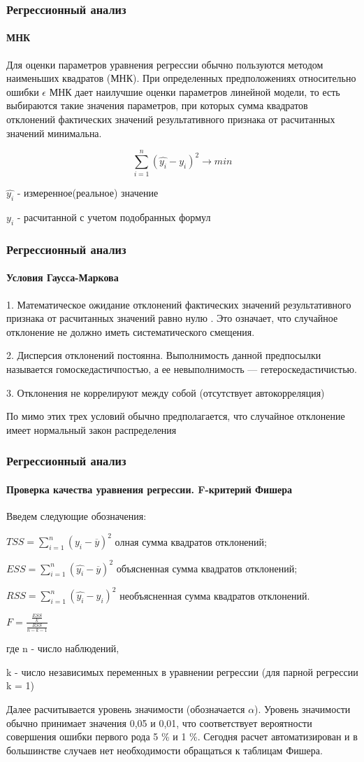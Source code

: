 \documentclass[10pt,pdf,hyperref={unicode}]{beamer}
\begin{document}
\begin{frame}
\frametitle{Регрессионный анализ} 
\framesubtitle{МНК}

Для оценки параметров  уравнения регрессии обычно пользуются
методом наименьших квадратов (МНК). При определенных предположениях
относительно ошибки $\epsilon$ МНК дает наилучшие оценки параметров линейной
модели, то  есть выбираются такие значения параметров, при которых
сумма квадратов отклонений фактических значений результативного признака
от расчитанных значений минимальна.

$$ \sum_{i=1}^n(\hat{y_i} -y_i)^2 \rightarrow min$$ 

$\hat{y_i}$ - измеренное(реальное) значение

$y_i$   -  расчитанной с учетом подобранных формул 


\end{frame}


\begin{frame}
\frametitle{Регрессионный анализ} 
\framesubtitle{Условия Гаусса-Маркова}
1. Математическое ожидание отклонений фактических значений результативного признака
от расчитанных значений  равно нулю . 
Это означает, что случайное отклонение не должно иметь систематического смещения.

2. Дисперсия отклонений постоянна. Выполнимость данной предпосылки называется гомоскедастичпостъю, а ее невыполнимость — гетероскедастичистью.

3.  Отклонения  не коррелируют между собой (отсутствует автокорреляция)

По мимо этих трех условий обычно предполагается, 
что случайное отклонение имеет нормальный закон распределения



\end{frame}



\begin{frame}
\frametitle{Регрессионный анализ} 
\framesubtitle{Проверка качества уравнения регрессии. F-критерий Фишера}

Введем следующие обозначения:

$TSS =\sum_{i=1}^n(y_i-\overline{y})^2 $  олная сумма квадратов отклонений;

$ESS =\sum_{i=1}^n(\hat{y_i}-\overline{y})^2 $ объясненная сумма квадратов отклонений;

$RSS =\sum_{i=1}^n(\hat{y_i} - y_i)^2 $ необъясненная сумма квадратов отклонений.

$ F=\frac{\frac{ESS}{k}}{\frac{RSS}{n-k-1}} $

где  n - число наблюдений, 

k - число независимых переменных в уравнении регрессии (для парной регрессии k = 1) 

Далее расчитывается уровень значимости (обозначается $\alpha$).
 Уровень значимости  обычно принимает значения 0,05 и 0,01, что соответствует вероятности 
 совершения ошибки первого рода 5 \% и 1 \%. Сегодня расчет автоматизирован 
 и  в большинстве случаев нет необходимости обращаться к таблицам Фишера.  


\end{frame}
\end{document}
